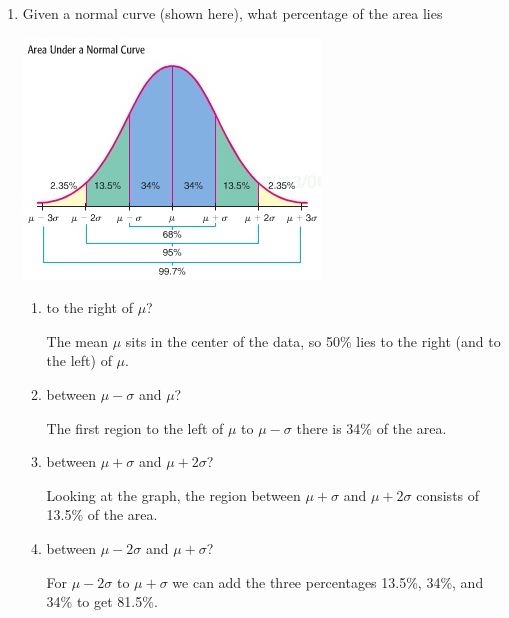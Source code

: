 \documentclass{article}
\newcommand{\answer}[1]{\color{red}#1}
\begin{document}
\pagestyle{myheadings}

\begin{center}
\textbf{}
\end{center}

\begin{enumerate}

\item Given a normal curve (shown here),  what percentage of the area lies 

\begin{center}
\includegraphics[scale=0.6]{WS10_NormalArea.jpg}
\end{center}

	\begin{enumerate}
	\item to the right of $\mu$? 
	
	{\answer The mean $\mu$ sits in the center of the data, so 50\% lies to the right (and to the left) of $\mu$.}
	
	\item between $\mu - \sigma$ and $\mu$? 
	
	{\answer The first region to the left of $\mu$ to $\mu-\sigma$ there is 34\% of the area.}
	
	\item between $\mu + \sigma$ and $\mu + 2\sigma$? 
	
	{\answer Looking at the graph, the region between $\mu + \sigma$ and $\mu +2\sigma$ consists of 13.5\% of the area.}
	
	\item between $\mu-2\sigma$ and $\mu + \sigma$? 
	
	{\answer For $\mu-2\sigma$ to $\mu + \sigma$ we can add the three percentages 13.5\%, 34\%, and 34\% to get 81.5\%.}
	

\end{enumerate}
\end{enumerate}
\end{document}
